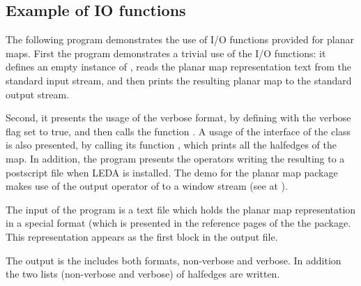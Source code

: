 \subsection{Example of IO functions}
\label{PM_sec:example9}

The following program demonstrates the use of I/O functions provided for planar maps. %
First the program demonstrates a trivial use of the I/O functions: 
it defines an empty instance of , 
reads the planar map representation text from the standard input stream, 
and then prints the resulting planar map to the standard output stream.

Second, it presents the usage of the verbose format, 
by defining  with the verbose flag set to true, 
and then calls the function .
A usage of the interface of the class  is also presented, 
by calling its function , which prints all the halfedges of the map.
In addition, the program presents the operators writing the resulting 
 to a postscript file when LEDA is installed. 
The demo for the planar map package makes use of the output operator 
of  to a window stream  
(see at  ).   



The input of the program is a text file which holds the planar map representation in a special format (which is presented in the reference pages of the the  package. 
This representation appears as the first block in the output file.
 

The output is the  includes both formats, non-verbose and verbose. In addition the two lists 
(non-verbose and verbose) of halfedges are written.















